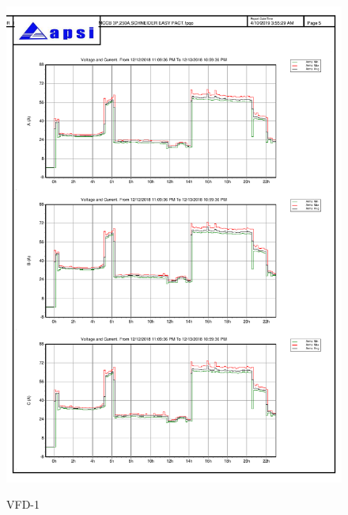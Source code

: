 \begin{figure}[]
	\includegraphics[width=\textwidth]{figures/fig_ch04_elecaudit_load_flow_vfd1.pdf} \\
	\caption{VFD-1 }
	\label{fig_ch04_elecaudit_load_flow_vfd1} 
\end{figure}

